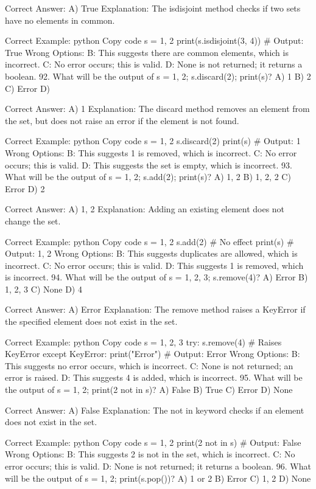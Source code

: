 Correct Answer: A) True
Explanation: The isdisjoint method checks if two sets have no elements in common.

Correct Example:
python
Copy code
s = {1, 2}
print(s.isdisjoint({3, 4}))  # Output: True
Wrong Options:
B: This suggests there are common elements, which is incorrect.
C: No error occurs; this is valid.
D: None is not returned; it returns a boolean.
92. What will be the output of s = {1, 2}; s.discard(2); print(s)?
A) {1}
B) {2}
C) Error
D) {}

Correct Answer: A) {1}
Explanation: The discard method removes an element from the set, but does not raise an error if the element is not found.

Correct Example:
python
Copy code
s = {1, 2}
s.discard(2)
print(s)  # Output: {1}
Wrong Options:
B: This suggests 1 is removed, which is incorrect.
C: No error occurs; this is valid.
D: This suggests the set is empty, which is incorrect.
93. What will be the output of s = {1, 2}; s.add(2); print(s)?
A) {1, 2}
B) {1, 2, 2}
C) Error
D) {2}

Correct Answer: A) {1, 2}
Explanation: Adding an existing element does not change the set.

Correct Example:
python
Copy code
s = {1, 2}
s.add(2)  # No effect
print(s)  # Output: {1, 2}
Wrong Options:
B: This suggests duplicates are allowed, which is incorrect.
C: No error occurs; this is valid.
D: This suggests 1 is removed, which is incorrect.
94. What will be the output of s = {1, 2, 3}; s.remove(4)?
A) Error
B) {1, 2, 3}
C) None
D) {4}

Correct Answer: A) Error
Explanation: The remove method raises a KeyError if the specified element does not exist in the set.

Correct Example:
python
Copy code
s = {1, 2, 3}
try:
    s.remove(4)  # Raises KeyError
except KeyError:
    print("Error")  # Output: Error
Wrong Options:
B: This suggests no error occurs, which is incorrect.
C: None is not returned; an error is raised.
D: This suggests 4 is added, which is incorrect.
95. What will be the output of s = {1, 2}; print(2 not in s)?
A) False
B) True
C) Error
D) None

Correct Answer: A) False
Explanation: The not in keyword checks if an element does not exist in the set.

Correct Example:
python
Copy code
s = {1, 2}
print(2 not in s)  # Output: False
Wrong Options:
B: This suggests 2 is not in the set, which is incorrect.
C: No error occurs; this is valid.
D: None is not returned; it returns a boolean.
96. What will be the output of s = {1, 2}; print(s.pop())?
A) 1 or 2
B) Error
C) {1, 2}
D) None

